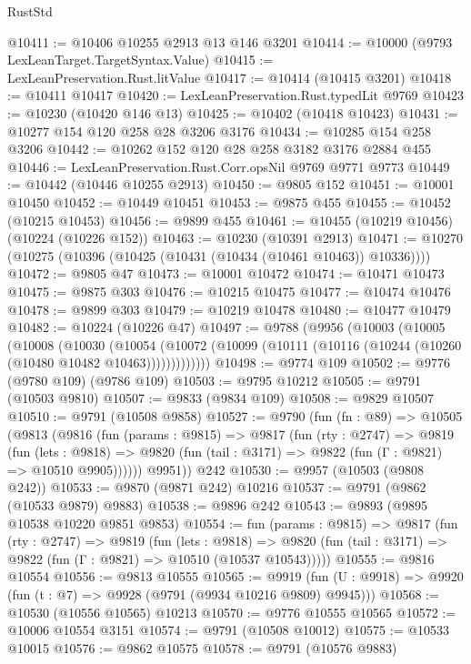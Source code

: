 \begin{lexlean}{RustStd}
\begin{coremodule}
@10411 := @10406 @10255 @2913 @13 @146 @3201
@10414 := @10000 (@9793 LexLeanTarget.TargetSyntax.Value)
@10415 := LexLeanPreservation.Rust.litValue
@10417 := @10414 (@10415 @3201)
@10418 := @10411 @10417
@10420 := LexLeanPreservation.Rust.typedLit @9769
@10423 := @10230 (@10420 @146 @13)
@10425 := @10402 (@10418 @10423)
@10431 := @10277 @154 @120 @258 @28 @3206 @3176
@10434 := @10285 @154 @258 @3206
@10442 := @10262 @152 @120 @28 @258 @3182 @3176 @2884 @455
@10446 := LexLeanPreservation.Rust.Corr.opsNil @9769 @9771 @9773
@10449 := @10442 (@10446 @10255 @2913)
@10450 := @9805 @152
@10451 := @10001 @10450
@10452 := @10449 @10451
@10453 := @9875 @455
@10455 := @10452 (@10215 @10453)
@10456 := @9899 @455
@10461 := @10455 (@10219 @10456) (@10224 (@10226 @152))
@10463 := @10230 (@10391 @2913)
@10471 := @10270 (@10275 (@10396 (@10425 (@10431 (@10434 (@10461 @10463)) @10336))))
@10472 := @9805 @47
@10473 := @10001 @10472
@10474 := @10471 @10473
@10475 := @9875 @303
@10476 := @10215 @10475
@10477 := @10474 @10476
@10478 := @9899 @303
@10479 := @10219 @10478
@10480 := @10477 @10479
@10482 := @10224 (@10226 @47)
@10497 := @9788
    (@9956
      (@10003
        (@10005
          (@10008
            (@10030
              (@10054
                (@10072 (@10099 (@10111 (@10116 (@10244 (@10260 (@10480 @10482 @10463)))))))))))))
@10498 := @9774 @109
@10502 := @9776 (@9780 @109) (@9786 @109)
@10503 := @9795 @10212
@10505 := @9791 (@10503 @9810)
@10507 := @9833 (@9834 @109)
@10508 := @9829 @10507
@10510 := @9791 (@10508 @9858)
@10527 := @9790
    (fun (fn : @89) =>
    @10505
      (@9813
        (@9816
          (fun (params : @9815) =>
          @9817
            (fun (rty : @2747) =>
            @9819
              (fun (lets : @9818) =>
              @9820 (fun (tail : @3171) => @9822 (fun (Γ : @9821) => @10510 @9905))))))
        @9951))
    @242
@10530 := @9957 (@10503 (@9808 @242))
@10533 := @9870 (@9871 @242) @10216
@10537 := @9791 (@9862 (@10533 @9879) @9883)
@10538 := @9896 @242
@10543 := @9893 (@9895 @10538 @10220 @9851 @9853)
@10554 := fun (params : @9815) =>
  @9817
    (fun (rty : @2747) =>
    @9819
      (fun (lets : @9818) =>
      @9820 (fun (tail : @3171) => @9822 (fun (Γ : @9821) => @10510 (@10537 @10543)))))
@10555 := @9816 @10554
@10556 := @9813 @10555
@10565 := @9919
    (fun (U : @9918) => @9920 (fun (t : @7) => @9928 (@9791 (@9934 @10216 @9809) @9945)))
@10568 := @10530 (@10556 @10565) @10213
@10570 := @9776 @10555 @10565
@10572 := @10006 @10554 @3151
@10574 := @9791 (@10508 @10012)
@10575 := @10533 @10015
@10576 := @9862 @10575
@10578 := @9791 (@10576 @9883)

\end{coremodule}
\end{lexlean}
